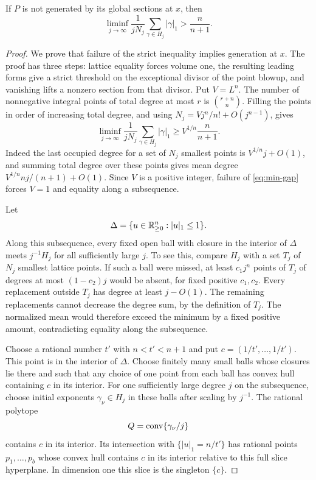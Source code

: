 \begin{proposition}
\label{prop:ordinary-gap}
If $P$ is not generated by its global sections at $x$, then
\begin{equation}
\label{eq:min-gap}
 \liminf_{j\longrightarrow\infty}
   \frac{1}{jN_j}\sum_{\gamma\in H_j}|\gamma|_1
       >\frac{n}{n+1}.
\end{equation}
\end{proposition}

\begin{proof}
We prove that failure of the strict inequality implies generation at
$x$. The proof has three steps: lattice equality forces volume one,
the resulting leading forms give a strict threshold on the exceptional
divisor of the point blowup, and vanishing lifts a nonzero section from
that divisor. Put $V=L^n$. The number of nonnegative integral points of total
degree at most $r$ is $\binom{r+n}{n}$. Filling the points in order of
increasing total degree, and using
$N_j=Vj^n/n!+O(j^{n-1})$, gives
\begin{equation}
\label{eq:min-lattice-lower}
 \liminf_{j\longrightarrow\infty}
 \frac{1}{jN_j}\sum_{\gamma\in H_j}|\gamma|_1
 \geq V^{1/n}\frac{n}{n+1}.
\end{equation}
Indeed the last occupied degree for a set of $N_j$ smallest points is
$V^{1/n}j+O(1)$, and summing total degree over these points gives mean
degree $V^{1/n}nj/(n+1)+O(1)$. Since $V$ is a positive integer, failure
of \eqref{eq:min-gap} forces $V=1$ and equality along a subsequence.

Let
\[
 \Delta=\{u\in\mathbb R_{\geq0}^n:|u|_1\leq1\}.
\]
Along this subsequence, every fixed open ball with closure in the
interior of $\Delta$ meets $j^{-1}H_j$ for all sufficiently large $j$.
To see this, compare $H_j$ with a set $T_j$ of $N_j$ smallest lattice
points. If such a ball were missed, at least $c_1j^n$ points of $T_j$
of degrees at most $(1-c_2)j$ would be absent, for fixed positive
$c_1,c_2$. Every replacement outside $T_j$ has degree at least
$j-O(1)$. The remaining replacements cannot decrease the degree sum,
by the definition of $T_j$. The normalized mean would therefore exceed
the minimum by a fixed positive amount, contradicting equality along
the subsequence.

Choose a rational number $t'$ with $n<t'<n+1$ and put
$c=(1/t',\ldots,1/t')$. This point is in the interior of $\Delta$.
Choose finitely many small balls whose closures lie there and such that
any choice of one point from each ball has convex hull containing $c$
in its interior. For one sufficiently large degree $j$ on the
subsequence, choose initial exponents $\gamma_\nu\in H_j$ in these
balls after scaling by $j^{-1}$. The rational polytope
\[
 Q=\operatorname{conv}\{\gamma_\nu/j\}
\]
contains $c$ in its interior. Its intersection with
$\{|u|_1=n/t'\}$ has rational points $p_1,\ldots,p_b$ whose convex
hull contains $c$ in its interior relative to this full slice
hyperplane. In dimension one this slice is the singleton $\{c\}$.


\end{proof}
